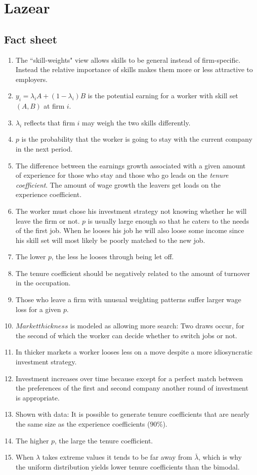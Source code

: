 \documentclass[12pt,a4paper]{article}
\begin{document}
  \section{Lazear} %
  \subsection{Fact sheet} %
  \begin{enumerate}
    \item The ``skill-weights" view allows skills to be general instead of firm-specific. Instead the relative importance of skills makes them more or less attractive to employers.
    \item $y_i = \lambda_i A+(1-\lambda_i)B$ is the potential earning for a worker with skill set $(A, B)$ at firm $i$.
    \item $\lambda_i$ reflects that firm $i$ may weigh the two skills differently.
    \item $p$ is the probability that the worker is going to stay with the current company in the next period.
    \item The difference between the earnings growth associated with a given amount of experience for those who stay and those who go leads on the \emph{tenure coefficient}. The amount of wage growth the leavers get loads on the experience coefficient.
    \item The worker must chose his investment strategy not knowing whether he will leave the firm or not. $p$ is usually large enough so that he caters to the needs of the first job. When he looses his job he will also loose some income since his skill set will most likely be poorly matched to the new job.
    \item The lower $p$, the less he looses through being let off.
    \item The tenure coefficient should be negatively related to the amount of turnover in the occupation.
    \item Those who leave a firm with unusual weighting patterns suffer larger wage loss for a given $p$.
    \item $Market thickness$ is modeled as allowing more search: Two draws occur, for the second of which the worker can decide whether to switch jobs or not.
    \item In thicker markets a worker looses less on a move despite a more idiosyncratic investment strategy.
	\item Investment increases over time because except for a perfect match between the preferences of the first and second company another round of investment is appropriate.
	\item Shown with data: It is possible to generate tenure coefficients that are nearly the same size as the experience coefficients ($90\%$).
	\item The higher $p$, the large the tenure coefficient.
	\item When $\lambda$ takes extreme values it tends to be far away from $\bar{\lambda}$, which is why the uniform distribution yields lower tenure coefficients than the bimodal.
  \end{enumerate}



\end{document}
